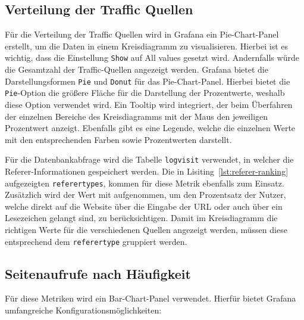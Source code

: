 \subsection{Verteilung der Traffic Quellen}
Für die Verteilung der Traffic Quellen wird in Grafana ein Pie-Chart-Panel erstellt, um die Daten in einem Kreisdiagramm zu visualisieren. Hierbei ist es wichtig, dass die Einstellung \texttt{Show} auf \glqq All values\grqq{} gesetzt wird. Andernfalls würde die Gesamtzahl der Traffic-Quellen angezeigt werden. Grafana bietet die Darstellungsformen \texttt{Pie} und \texttt{Donut} für das Pie-Chart-Panel. Hierbei bietet die \texttt{Pie}-Option die größere Fläche für die Darstellung der Prozentwerte, weshalb diese Option verwendet wird. Ein Tooltip wird integriert, der beim Überfahren der einzelnen Bereiche des Kreisdiagramms mit der Maus den jeweiligen Prozentwert anzeigt. Ebenfalls gibt es eine Legende, welche die einzelnen Werte mit den entsprechenden Farben sowie Prozentwerten darstellt.

Für die Datenbankabfrage wird die Tabelle \texttt{log\textunderscore visit} verwendet, in welcher die Referer-Informationen gespeichert werden. Die in Lisiting~\ref{lst:referer-ranking} aufgezeigten \texttt{referer\textunderscore types}, kommen für diese Metrik ebenfalls zum Einsatz. Zusätzlich wird der Wert \grqq{} mit aufgenommen, um den Prozentsatz der Nutzer, welche direkt auf die Website über die Eingabe der URL oder auch über ein Lesezeichen gelangt sind, zu berücksichtigen. Damit im Kreisdiagramm die richtigen Werte für die verschiedenen Quellen angezeigt werden, müssen diese entsprechend dem \texttt{referer\textunderscore type} gruppiert werden.

\subsection{Seitenaufrufe nach Häufigkeit}
Für diese Metriken wird ein Bar-Chart-Panel verwendet. Hierfür bietet Grafana umfangreiche Konfigurationsmöglichkeiten: 

